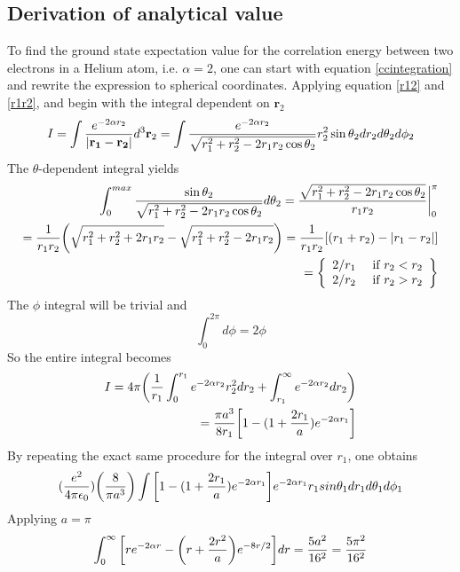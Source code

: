 \documentclass[%
reprint,
amsmath,amssymb,
aps,
]{revtex4-1}
\begin{document}
\subsection{Derivation of analytical value}\noindent 
To find the ground state expectation value for the correlation energy between two electrons in a Helium atom, i.e. $\alpha = 2$, one can start with equation \ref{ccintegration} and rewrite the expression to spherical coordinates. Applying equation \ref{r12} and \ref{r1r2}, and begin with the integral dependent on $\mathbf{r}_2$
\begin{equation*}
	I = \int \dfrac{e^{-2\alpha r_2}}{\abs{\mathbf{r_1}-\mathbf{r_2}}}d^3\mathbf{r}_2 = \int \dfrac{e^{-2\alpha r_2}}{\sqrt{r_1^2+r_2^2-2r_1r_2\cos\theta_2}}r_2^2\sin\theta_2dr_2d\theta_2d\phi_2 
\end{equation*}
The $\theta$-dependent integral yields
\begin{align*}
	\int_{0}^{max}\dfrac{\sin\theta_2}{\sqrt{r_1^2+r_2^2-2r_1r_2\cos\theta_2}}d\theta_2 = \dfrac{\sqrt{r_1^2+r_2^2-2r_1r_2\cos\theta_2}}{r_1r_2} \bigg|_0^\pi \\
	= \dfrac{1}{r_1r_2}\qty(\sqrt{r_1^2+r_2^2 + 2r_1r_2} - \sqrt{r_1^2+r_2^2 -2r_1r_2})
	= \dfrac{1}{r_1r_2}\qty[(r_1+r_2)-\abs{r_1-r_2}]\\
	= 	 \left\{
	\begin{array}{ll}
	2/r_1 & \textnormal{ if } r_2 < r_2\\
	2/r_2 & \textnormal{ if } r_2 > r_2
	\end{array} \right\} \\ 
\end{align*}
The $\phi$ integral will be trivial and
\begin{equation*}
	\int_{0}^{2\pi}d\phi = 2\phi
\end{equation*}
So the entire integral becomes 
\begin{align*}
	I = 4\pi\qty(\dfrac{1}{r_1}\int_{0}^{r_1}e^{-2\alpha r_2}r_2^2dr_2 + \int_{r_1}^{\infty}e^{-2\alpha r_2}dr_2) \\ 
	= \dfrac{\pi a^3}{8r_1}\qty[1-(1+\dfrac{2r_1}{a})e^{-2\alpha r_1}]
\end{align*}
By repeating the exact same procedure for the integral over $r_1$, one obtains
\begin{align*}
	(\dfrac{e^2}{4\pi\epsilon_0})\qty(\dfrac{8}{\pi a^3})\int\qty[1-(1+\dfrac{2r_1}{a})e^{-2\alpha r_1}]e^{-2\alpha r_1}r_1sin\theta_1dr_1d\theta_1d\phi_1
\end{align*}
Applying $a=\pi$
\begin{equation*}
	\int_{0}^{\infty}\qty[re^{-2\alpha r}-\qty(r+\dfrac{2r^2}{a})e^{-8r/2}]dr = \dfrac{5a^2}{16^2} = \dfrac{5\pi^2}{16^2}
\end{equation*}
\end{document}
